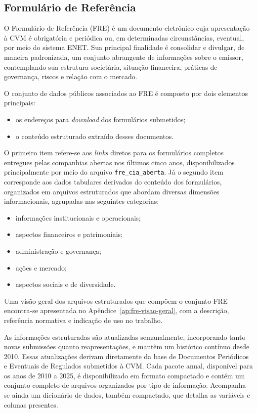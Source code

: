 \subsection{Formulário de Referência}

O Formulário de Referência (FRE) é um documento eletrônico cuja apresentação à CVM é obrigatória e periódica ou, em determinadas circunstâncias, eventual, por meio do sistema ENET. Sua principal finalidade é consolidar e divulgar, de maneira padronizada, um conjunto abrangente de informações sobre o emissor, contemplando sua estrutura societária, situação financeira, práticas de governança, riscos e relação com o mercado.

O conjunto de dados públicos associados ao FRE é composto por dois elementos principais:

\begin{itemize}
	\item os endereços para \textit{download} dos formulários submetidos;
	\item o conteúdo estruturado extraído desses documentos.
\end{itemize}

O primeiro item refere-se aos \textit{links} diretos para os formulários completos entregues pelas companhias abertas nos últimos cinco anos, disponibilizados principalmente por meio do arquivo \texttt{fre\_cia\_aberta}. Já o segundo item corresponde aos dados tabulares derivados do conteúdo dos formulários, organizados em arquivos estruturados que abordam diversas dimensões informacionais, agrupadas nas seguintes categorias:

\begin{itemize}
	\item informações institucionais e operacionais;
	\item aspectos financeiros e patrimoniais;
	\item administração e governança;
	\item ações e mercado;
	\item aspectos sociais e de diversidade.
\end{itemize}

Uma visão geral dos arquivos estruturados que compõem o conjunto FRE encontra-se apresentada no Apêndice~\ref{ap:fre-visao-geral}, com a descrição, referência normativa e indicação de uso no trabalho.

As informações estruturadas são atualizadas semanalmente, incorporando tanto novas submissões quanto reapresentações, e mantêm um histórico contínuo desde 2010. Essas atualizações derivam diretamente da base de Documentos Periódicos e Eventuais de Regulados submetidos à CVM. Cada pacote anual, disponível para os anos de 2010 a 2025, é disponibilizado em formato compactado e contém um conjunto completo de arquivos organizados por tipo de informação. Acompanha-se ainda um dicionário de dados, também compactado, que detalha as variáveis e colunas presentes.

